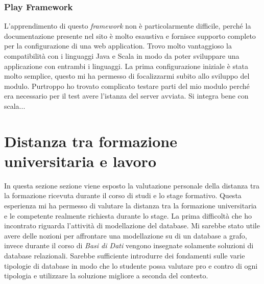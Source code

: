 \subsubsection{Play Framework}
L'apprendimento di questo \emph{framework} non è particolarmente difficile, perché la documentazione presente nel sito è molto esaustiva e fornisce supporto completo per la configurazione di una web application. Trovo molto vantaggioso la compatibilità con i linguaggi Java e Scala in modo da poter sviluppare una applicazione con entrambi i linguaggi. La prima configurazione iniziale è stata molto semplice, questo mi ha permesso di focalizzarmi subito allo sviluppo del modulo. Purtroppo ho trovato complicato testare parti del mio modulo perché era necessario per il test avere l'istanza del server avviata. Si integra bene con scala...




\section{Distanza tra formazione universitaria e lavoro}
In questa sezione sezione viene esposto la valutazione personale della distanza tra la formazione ricevuta durante il corso di studi e lo stage formativo.
Questa esperienza mi ha permesso di valutare la distanza tra la formazione universitaria e le competente realmente richiesta durante lo stage.
La prima difficoltà che ho incontrato riguarda l'attività di modellazione del database. Mi sarebbe stato utile avere delle nozioni per affrontare una modellazione su di un database a grafo, invece durante il corso di \emph{Basi di Dati} vengono insegnate solamente soluzioni di database relazionali. Sarebbe sufficiente introdurre dei fondamenti sulle varie tipologie di database in modo che lo studente possa valutare pro e contro di ogni tipologia e utilizzare la soluzione migliore a seconda del contesto.





